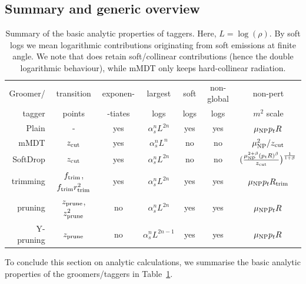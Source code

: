  
\subsection{Summary and generic overview}

\begin{table}
  \centering
  \begin{tabular}{r|cccccc}
    Groomer/  & transition & exponen- & largest & soft & non-global & non-pert\\
    tagger    &  points & -tiates &  logs & logs &  logs  & $m^2$ scale\\
    \hline
    Plain     & -                         & yes & $\alpha_s^nL^{2n}$ &  yes  & yes & $\mu_\text{NP} p_tR$\\
    mMDT      & $z_{\text{cut}}$                   & yes & $\alpha_s^nL^{n}$ & no  & no & $\mu_\text{NP}^2/z_{\text{cut}}$\\
    SoftDrop  & $z_{\text{cut}}$                   & yes & $\alpha_s^nL^{2n}$ & no  & no & $(\tfrac{\mu_\text{NP}^{2+\beta}(p_tR)^\beta}{z_{\text{cut}}}\big)^{\frac{1}{1+\beta}}$\\
    trimming  & $f_{\text{trim}}$,$f_{\text{trim}}r_{\text{trim}}^2$ & yes & $\alpha_s^nL^{2n}$ & yes & yes & $\mu_\text{NP} p_tR_{\text{trim}}$\\
    pruning   & $z_{\text{prune}}$,$z_{\text{prune}}^2$     & no  & $\alpha_s^nL^{2n}$ & yes & yes & $\mu_\text{NP} p_tR$\\
    Y-pruning & $z_{\text{prune}}$                 & no  & $\alpha_s^nL^{2n-1}$
                                                & yes & yes & $\mu_\text{NP} p_tR$\\
    \hline
  \end{tabular}
  \caption{Summary of the basic analytic properties of taggers. Here,
    $L=\log(\rho)$. By soft logs we mean logarithmic contributions
    originating from soft emissions at finite angle. We note that \SD
    does retain soft/collinear contributions (hence the double
    logarithmic behaviour), while mMDT only keeps hard-collinear
    radiation. 
  }\label{tab:groomers-analytic-props}
\end{table}

To conclude this section on analytic calculations, we summarise the
basic analytic properties of the groomers/taggers in
Table~\ref{tab:groomers-analytic-props}.

